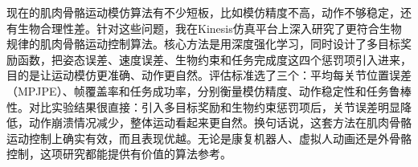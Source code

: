 \begin{abstractzh}

现在的肌肉骨骼运动模仿算法有不少短板，比如模仿精度不高，动作不够稳定，还有生物合理性差。针对这些问题，我在Kinesis仿真平台上深入研究了更符合生物规律的肌肉骨骼运动控制算法。核心方法是用深度强化学习，同时设计了多目标奖励函数，把姿态误差、速度误差、生物约束和任务完成度这四个惩罚项引入进来，目的是让运动模仿更准确、动作更自然。评估标准选了三个：平均每关节位置误差（MPJPE）、帧覆盖率和任务成功率，分别衡量模仿精度、动作稳定性和任务鲁棒性。对比实验结果很直接：引入多目标奖励和生物约束惩罚项后，关节误差明显降低，动作崩溃情况减少，整体运动看起来更自然。换句话说，这套方法在肌肉骨骼运动控制上确实有效，而且表现优越。无论是康复机器人、虚拟人动画还是外骨骼控制，这项研究都能提供有价值的算法参考。

\end{abstractzh}
